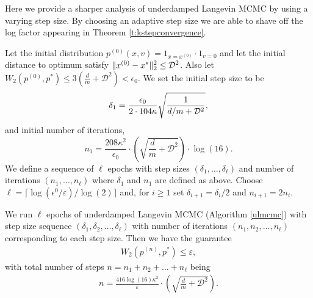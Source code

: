 \label{s:stepsizechange}
Here we provide a sharper analysis of underdamped Langevin MCMC by using a varying step size. By choosing an adaptive step size we are able to shave off the log factor appearing in Theorem \ref{t:kstepconvergence}.

\begin{theorem}\label{t:loggone}
Let the initial distribution $p^{(0)}(x,v) =1_{x=x^{(0)}} \cdot 1_{v=0}$ and let the initial distance to optimum satisfy $ \lVert x^{(0)} - x^* \rVert_2^2 \le \mathcal{D}^2$. Also let $W_2(p^{(0)},p^*) \le 3\left(\frac{d}{m}+\mathcal{D}^2\right) < \epsilon_0$.  We set the initial step size to be  
$$\delta_1 = \frac{\epsilon_0 }{2\cdot 104 \kappa} \sqrt{\frac{1}{d/m + \mathcal{D}^2}}, $$
and initial number of iterations,
$$n_1 =  \frac{208\kappa^2}{ \epsilon_0}\cdot\left(\sqrt{\frac{d}{m}+ \mathcal{D}^2}\right)\cdot \log(16).$$
We define a sequence of $\ell$ epochs with step sizes $(\delta_1,\ldots,\delta_{\ell})$ and number of iterations $(n_1,\ldots,n_{\ell})$ where $\delta_1$ and $n_1$ are defined as above. Choose $\ell = \lceil \log(\epsilon^0/\varepsilon)/\log(2)\rceil$ and, for $i\ge 1$ set $\delta_{i+1} = \delta_{i}/2$ and $n_{i+1} = 2 n_{i}$. 

We run $\ell$ epochs of underdamped Langevin MCMC (Algorithm \ref{ulmcmc}) with step size sequence $(\delta_1,\delta_2,\ldots,\delta_{\ell})$ with number of iterations $(n_1,n_2,\ldots,n_{\ell})$ corresponding to each step size. Then we have the guarantee 
\begin{align*}
W_2(p^{(n)} , p^*)\leq \varepsilon,
\end{align*}
with total number of steps $n=n_1+n_2+\ldots+n_{\ell}$ being 
\begin{align*}
n = \frac{416 \log(16)\kappa^2}{ \varepsilon}\cdot \left( \sqrt{\frac{d}{m}+ \mathcal{D}^2}\right).
\end{align*}
\end{theorem}
